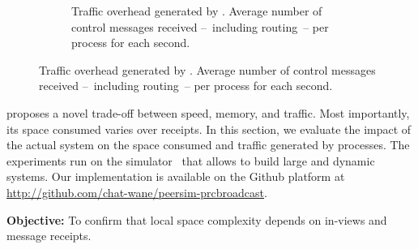 \begin{figure}
\begin{center}
\begin{subfigure}{0.495\textwidth}
      \caption{\label{fig:controlmessages}Traffic overhead generated by
        \RPCBROADCAST.  Average number of control messages received --~including
        routing~-- per process for each second.}
    \end{subfigure}
  \end{center}
\end{figure}


\RPCBROADCAST proposes a novel trade-off between speed, memory, and
traffic. Most importantly, its space consumed varies over receipts. In this
section, we evaluate the impact of the actual system on the space consumed and
traffic generated by processes. The experiments run on the \PEERSIM
simulator~\cite{montresor2009peersim} that allows to build large and dynamic
systems. Our implementation is available on the Github platform at
\url{http://github.com/chat-wane/peersim-prcbroadcast}.


%   

\noindent \textbf{Objective:} To confirm that local space complexity
depends on in-views and message receipts.

